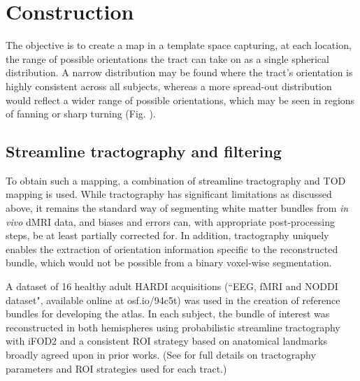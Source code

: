 \section{Construction}



The objective is to create a map in a template space capturing, at each location, the range of possible orientations the tract can take on as a single spherical distribution.
A narrow distribution may be found where the tract's orientation is highly consistent across all subjects, whereas a more spread-out distribution would reflect a wider range of possible orientations, which may be seen in regions of fanning or sharp turning (Fig. ).

\subsection{Streamline tractography and filtering}



To obtain such a mapping, a combination of streamline tractography and TOD mapping \autocite{Dhollander2014} is used.
While tractography has significant limitations as discussed above, it remains the standard way of segmenting white matter bundles from \textit{in vivo} dMRI data, and biases and errors can, with appropriate post-processing steps, be at least partially corrected for.
In addition, tractography uniquely enables the extraction of orientation information specific to the reconstructed bundle, which would not be possible from a binary voxel-wise segmentation.

A dataset of 16 healthy adult HARDI acquisitions (``EEG, fMRI and NODDI dataset",\autocite{Clayden2020} available online at osf.io/94c5t) was used in the creation of reference bundles for developing the atlas.
In each subject, the bundle of interest was reconstructed in both hemispheres using probabilistic streamline tractography with iFOD2 \autocite{Tournier2010} and a consistent ROI strategy based on anatomical landmarks broadly agreed upon in prior works. (See  for full details on tractography parameters and ROI strategies used for each tract.)

